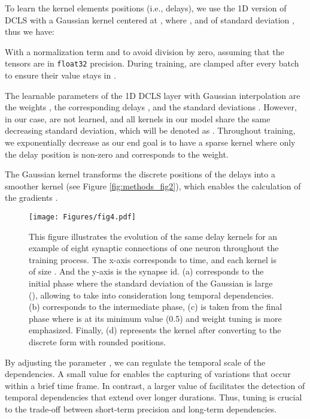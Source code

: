\documentclass{article} \usepackage{iclr2024_conference,times}
\begin{document}
To learn the kernel elements positions (i.e., delays), we use the 1D version of DCLS \citep{hassani2023dilated}  with a Gaussian kernel \citep{khalfaouihassani2023dilated} centered at , where , and of standard deviation , thus we have:




With  a normalization term and  to avoid division by zero, assuming that the tensors are in \texttt{float32} precision. During training,  are clamped after every batch to ensure their value stays in .

The learnable parameters of the 1D DCLS layer with Gaussian interpolation are the weights , the corresponding delays , and the standard deviations . However, in our case,  are not learned, and all kernels in our model share the same decreasing standard deviation, which will be denoted as . Throughout training, we exponentially decrease  as our end goal is to have a sparse kernel where only the delay position is non-zero and corresponds to the weight.

The Gaussian kernel transforms the discrete positions of the delays into a smoother kernel (see Figure \ref{fig:methods_fig2}), which enables the calculation of the gradients .

\begin{figure}[!ht]

  \centering
  \texttt{[image: Figures/fig4.pdf]}
  \caption{ This figure illustrates the evolution of the same delay kernels for an example of eight synaptic connections of one neuron throughout the training process. The x-axis corresponds to time, and each kernel is of size . And the y-axis is the synapse id. (a) corresponds to the initial phase where the standard deviation of the Gaussian  is large (), allowing to take into consideration long temporal dependencies. (b) corresponds to the intermediate phase, (c) is taken from the final phase where  is at its minimum value (0.5) and weight tuning is more emphasized. Finally, (d) represents the kernel after converting to the discrete form with rounded positions.}
  \label{fig:methods_fig3}
\end{figure}


By adjusting the parameter , we can regulate the temporal scale of the dependencies. A small value for  enables the capturing of variations that occur within a brief time frame. In contrast, a larger value of  facilitates the detection of temporal dependencies that extend over longer durations. Thus,  tuning is crucial to the trade-off between short-term precision and long-term dependencies.
\end{document}
